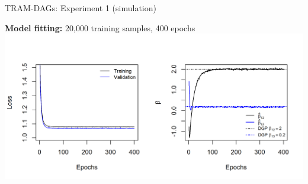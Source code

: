 \documentclass[onlytextwidth,english]{beamer}\usepackage[]{graphicx}\usepackage[]{xcolor}
\begin{document}
\begin{frame}{TRAM-DAGs: Experiment 1 (simulation)}


\textbf{Model fitting:} 20,000 training samples, 400 epochs
{
\centering
  \includegraphics[width=1\linewidth]{img/experiment1/exp1_loss_parameters.png}
}
  


\end{frame}
\end{document}
